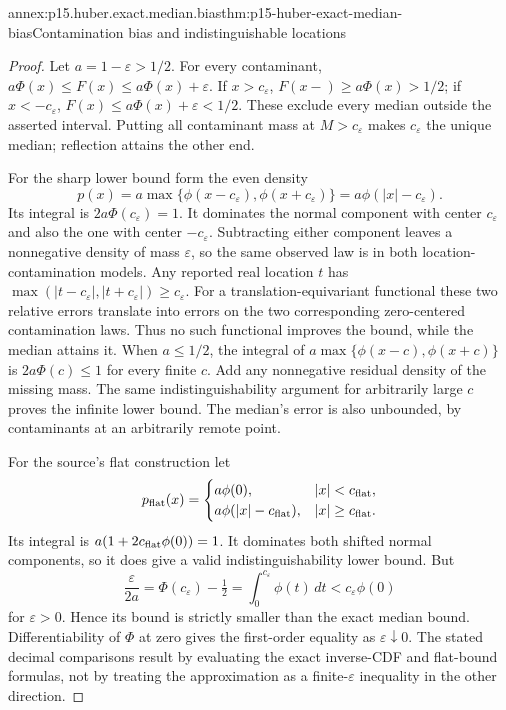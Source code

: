 \begin{annexitem}{annex:p15.huber.exact.median.bias}{thm:p15-huber-exact-median-bias}{Contamination bias and indistinguishable locations}
\begin{proof}
Let \(a=1-\varepsilon>1/2\). For every contaminant,
\(a\Phi(x)\leq F(x)\leq a\Phi(x)+\varepsilon\).
If \(x>c_\varepsilon\), \(F(x-)\geq a\Phi(x)>1/2\);
if \(x<-c_\varepsilon\), \(F(x)\leq a\Phi(x)+\varepsilon<1/2\).
These exclude every median outside the asserted interval.
Putting all contaminant mass at \(M>c_\varepsilon\) makes
\(c_\varepsilon\) the unique median; reflection attains the other end.

For the sharp lower bound form the even density
\[
 p(x)=a\max\{\phi(x-c_\varepsilon),\phi(x+c_\varepsilon)\}
     =a\phi(|x|-c_\varepsilon).
\]
Its integral is \(2a\Phi(c_\varepsilon)=1\).
It dominates the normal component with center \(c_\varepsilon\)
and also the one with center \(-c_\varepsilon\).
Subtracting either component leaves a nonnegative density of
mass \(\varepsilon\), so the same observed law is in both
location-contamination models. Any reported real location \(t\)
has \(\max(|t-c_\varepsilon|,|t+c_\varepsilon|)\geq c_\varepsilon\).
For a translation-equivariant functional these two relative errors
translate into errors on the two corresponding zero-centered
contamination laws. Thus no such functional improves the bound,
while the median attains it.
When \(a\leq1/2\), the integral of
\(a\max\{\phi(x-c),\phi(x+c)\}\) is \(2a\Phi(c)\leq1\)
for every finite \(c\). Add any nonnegative residual density of
the missing mass. The same indistinguishability argument for
arbitrarily large \(c\) proves the infinite lower bound.
The median's error is also unbounded, by contaminants at an
arbitrarily remote point.

For the source's flat construction let
\[
 p_{\rm flat}(x)=
 \begin{cases}
 a\phi(0),&|x|<c_{\rm flat},\\
 a\phi(|x|-c_{\rm flat}),&|x|\geq c_{\rm flat}.
 \end{cases}
\]
Its integral is \(a(1+2c_{\rm flat}\phi(0))=1\).
It dominates both shifted normal components, so it does give
a valid indistinguishability lower bound.
But
\[
 \frac{\varepsilon}{2a}
 =\Phi(c_\varepsilon)-\tfrac12
 =\int_0^{c_\varepsilon}\phi(t)\,dt
 <c_\varepsilon\phi(0)
\]
for \(\varepsilon>0\). Hence its bound is strictly smaller than
the exact median bound. Differentiability of \(\Phi\) at zero gives
the first-order equality as \(\varepsilon\downarrow0\).
The stated decimal comparisons result by evaluating the exact
inverse-CDF and flat-bound formulas, not by treating the approximation
as a finite-\(\varepsilon\) inequality in the other direction.
\end{proof}
\end{annexitem}

